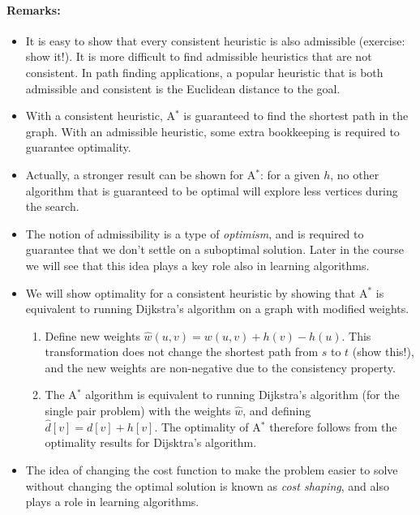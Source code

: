 \paragraph{Remarks:}
\begin{itemize}
  \item It is easy to show that every consistent heuristic is also admissible (exercise: show it!). It is more difficult to find admissible heuristics that are not consistent. In path finding applications, a popular heuristic that is both admissible and consistent is the Euclidean distance to the goal.
  \item With a consistent heuristic, A$^*$ is guaranteed to find the shortest path in the graph. With an admissible heuristic, some extra bookkeeping is required to guarantee optimality. 
  \item Actually, a stronger result can be shown for A$^*$: for a given $h$, no other algorithm that is guaranteed to be optimal will explore less vertices during the search.
  \item The notion of admissibility is a type of \emph{optimism}, and is required to guarantee that we don't settle on a suboptimal solution. Later in the course we will see that this idea plays a key role also in learning algorithms. 
  \item We will show optimality for a consistent heuristic by showing that A$^*$ is equivalent to running Dijkstra's algorithm on a graph with modified weights.
  \begin{enumerate}
      \item Define new weights $\hat{w}(u,v) = w(u,v) + h(v) - h(u)$. This transformation does not change the shortest path from $s$ to $t$ (show this!), and the new weights are non-negative due to the consistency property.
      \item The A$^*$ algorithm is equivalent to running Dijkstra's algorithm (for the single pair problem) with the weights $\hat{w}$, and defining $\hat{d}[v] = d[v] + h[v]$. The optimality of A$^*$ therefore follows from the optimality results for Dijsktra's algorithm.
  \end{enumerate}
  \item The idea of changing the cost function to make the problem easier to solve without changing the optimal solution is known as \textit{cost shaping}, and also plays a role in learning algorithms.
\end{itemize}

